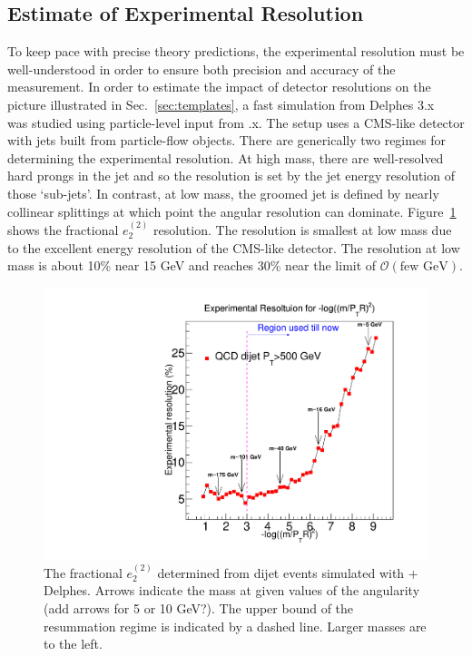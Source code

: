 \subsection{Estimate of Experimental Resolution}
\label{sec:resolution}

To keep pace with precise theory predictions, the experimental
resolution must be well-understood in order to ensure both precision
and accuracy of the measurement.  In order to estimate the impact of
detector resolutions on the picture illustrated in
Sec.~\ref{sec:templates}, a fast simulation from Delphes
3.x~\cite{deFavereau:2013fsa} was studied using particle-level input
from \pythia.x.  The setup uses a CMS-like detector with jets built from
particle-flow objects.  There are generically two regimes for
determining the experimental resolution.  At high mass, there are
well-resolved hard prongs in the jet and so the resolution is set by
the jet energy resolution of those `sub-jets'.  In contrast, at low
mass, the groomed jet is defined by nearly collinear splittings at
which point the angular resolution can dominate.
Figure~\ref{fig:resolution} shows the fractional $e_2^{(2)}$
resolution.  The resolution is smallest at low mass 
due to the excellent energy resolution of the CMS-like detector.  The
resolution at low mass is about 10\% near 15 GeV and reaches 30\% near
the limit of $\mathcal{O}(\text{few GeV})$.

\begin{figure}[h!]
\begin{center}
\includegraphics[width = 0.49\columnwidth]{figures/experimentaldemo/Resolution_plot_logrho_updated.pdf}
\end{center}
\caption{The fractional $e_2^{(2)}$ determined from dijet events simulated with \pythia + Delphes.  Arrows indicate the mass at given values of the angularity (add arrows for 5 or 10 GeV?).  The upper bound of the resummation regime is indicated by a dashed line.  Larger masses are to the left.}
\label{fig:resolution}
\end{figure}

